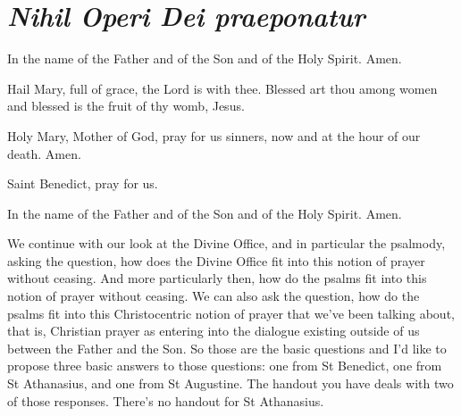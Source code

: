 \chapter{\textit{Nihil Operi Dei praeponatur}}

\begin{itshape}
In the name of the Father and of the Son and of the Holy Spirit. Amen.

\smallskip

\noindent Hail Mary, full of grace, the Lord is with thee. Blessed art thou among women and blessed is the fruit of thy womb, Jesus.

\smallskip

\noindent Holy Mary, Mother of God, pray for us sinners, now and at the hour of our death. Amen.

\smallskip

\noindent Saint Benedict, pray for us.

\smallskip

\noindent In the name of the Father and of the Son and of the Holy Spirit. Amen.

\end{itshape}

\smallskip

We continue with our look at the Divine Office, and in particular the psalmody, asking the question, how does the Divine Office fit into this notion of prayer without ceasing. And more particularly then, how do the psalms fit into this notion of prayer without ceasing. We can also ask the question, how do the psalms fit into this Christocentric notion of prayer that we've been talking about, that is, Christian prayer as entering into the dialogue existing outside of us between the Father and the Son. So those are the basic questions and I'd like to propose three basic answers to those questions: one from St Benedict, one from St Athanasius, and one from St Augustine. The handout you have deals with two of those responses. There's no handout for St Athanasius.

